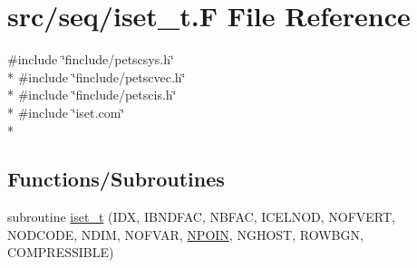 \hypertarget{seq_2iset__t_8_f}{\section{src/seq/iset\-\_\-t.F File Reference}
\label{seq_2iset__t_8_f}
}
{\ttfamily \#include \char`\"{}finclude/petscsys.\-h\char`\"{}}\\*
{\ttfamily \#include \char`\"{}finclude/petscvec.\-h\char`\"{}}\\*
{\ttfamily \#include \char`\"{}finclude/petscis.\-h\char`\"{}}\\*
{\ttfamily \#include \char`\"{}iset.\-com\char`\"{}}\\*
\subsection*{Functions/\-Subroutines}
\begin{DoxyCompactItemize}
\item 
subroutine \hyperlink{seq_2iset__t_8_f_a9d076ef4de2b9363a90ded67fb56769e}{iset\-\_\-t} (I\-D\-X, I\-B\-N\-D\-F\-A\-C, N\-B\-F\-A\-C, I\-C\-E\-L\-N\-O\-D, N\-O\-F\-V\-E\-R\-T, N\-O\-D\-C\-O\-D\-E, N\-D\-I\-M, N\-O\-F\-V\-A\-R, \hyperlink{mesh_8com_ae28c1572321efcd8715b974d87d20c58}{N\-P\-O\-I\-N}, N\-G\-H\-O\-S\-T, R\-O\-W\-B\-G\-N, C\-O\-M\-P\-R\-E\-S\-S\-I\-B\-L\-E)
\end{DoxyCompactItemize}


